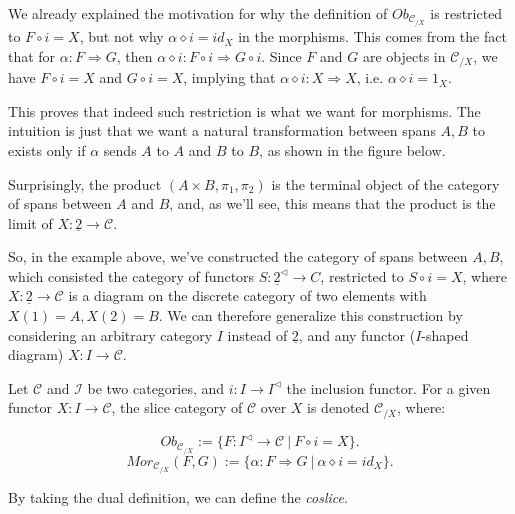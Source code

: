 \begin{example}
	We already explained the motivation for why the definition of $Ob_{\mathcal C_{/X}}$
	is restricted to $F\circ i = X$,
	but not why $\alpha \diamond i = id_{X}$ in the morphisms. This comes from the fact
	that for $\alpha:F \Rightarrow G$, then
	$\alpha \diamond i: F \circ i \Rightarrow G \circ i$. Since
	$F$ and $G$ are objects in $\mathcal C_{/X}$, we have
	$F \circ i = X$ and $G \circ i = X$, implying that
	$\alpha \diamond i: X \Rightarrow X$, i.e. $\alpha \diamond i = 1_{X}$.

	This proves that indeed such restriction is what we want for morphisms. The intuition
	is just that we want a natural transformation between spans $A, B$ to exists
	only if $\alpha$ sends $A$ to $A$ and $B$ to $B$, as shown in the figure below.

	Surprisingly, the product $(A\times B, \pi_1, \pi_2)$ is the terminal object
	of the category of spans between $A$ and $B$, and, as we'll see, this means
	that the product is the limit of $X:\underline{2} \to \mathcal C$.
\end{example}

So, in the example above, we've constructed the category of spans between $A,B$,
which consisted the category of functors $S:\underline{2}^\lhd \to C$, restricted
to $S \circ i = X$, where $X: \underline{2}\to \mathcal C$ is a diagram
on the discrete category of two elements with $X(1) = A, X(2) = B$.
We can therefore generalize this construction
by considering an arbitrary category $I$ instead of $\underline{2}$,
and any functor ($I$-shaped diagram) $X:I\to \mathcal C$.

\begin{definition}
	Let $\mathcal C$ and $\mathcal I$ be two categories, and $i:I \to I^{\lhd}$ the
	inclusion functor. For a given functor $X:I \to \mathcal C$, the slice category
	of $\mathcal C$ over $X$ is denoted $\mathcal C_{/X}$, where:

	\begin{displaymath}
		Ob_{\mathcal C_{/ X}}:=\{
		F: I^\lhd \to \mathcal C \ | \ F \circ i = X
		\}.
	\end{displaymath}
	\begin{displaymath}
		Mor_{\mathcal C_{/X}}(F,G):=\{
		\alpha: F \Rightarrow G \ | \ \alpha \diamond i = id_{X}
		\}.
	\end{displaymath}
\end{definition}

By taking the dual definition, we can define the \textit{coslice}.

